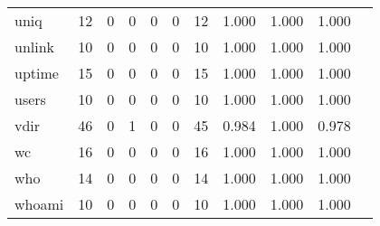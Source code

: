 \begin{longtable}{lp{1.10cm}p{1.10cm}p{1.10cm}p{1.10cm}p{1.10cm}p{1.10cm}p{1.10cm}p{1.10cm}p{1.10cm}p{1.10cm}}
uniq      &                     12 &                                  0 &                                 0 &                                0 &                                 0 &                              12 &                          1.000 &                                 1.000 &                               1.000 \\
unlink    &                     10 &                                  0 &                                 0 &                                0 &                                 0 &                              10 &                          1.000 &                                 1.000 &                               1.000 \\
uptime    &                     15 &                                  0 &                                 0 &                                0 &                                 0 &                              15 &                          1.000 &                                 1.000 &                               1.000 \\
users     &                     10 &                                  0 &                                 0 &                                0 &                                 0 &                              10 &                          1.000 &                                 1.000 &                               1.000 \\
vdir      &                     46 &                                  0 &                                 1 &                                0 &                                 0 &                              45 &                          0.984 &                                 1.000 &                               0.978 \\
wc        &                     16 &                                  0 &                                 0 &                                0 &                                 0 &                              16 &                          1.000 &                                 1.000 &                               1.000 \\
who       &                     14 &                                  0 &                                 0 &                                0 &                                 0 &                              14 &                          1.000 &                                 1.000 &                               1.000 \\
whoami    &                     10 &                                  0 &                                 0 &                                0 &                                 0 &                              10 &                          1.000 &                                 1.000 &                               1.000 \\

\end{longtable}
